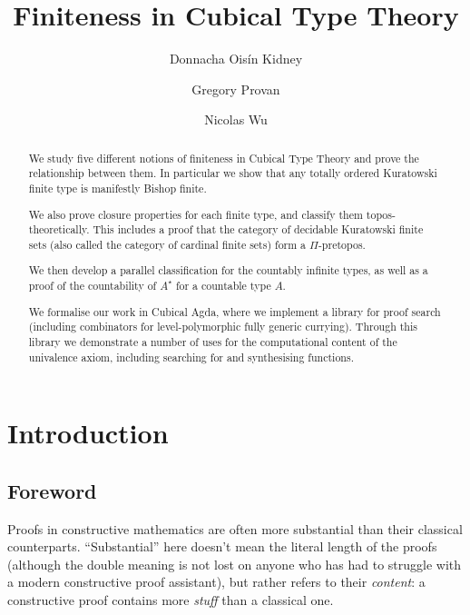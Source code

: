 

\author{
  Donnacha Oisín Kidney \and
  Gregory Provan \and
  Nicolas Wu
}

\title{Finiteness in Cubical Type Theory}





\maketitle
\begin{abstract}
  We study five different notions of finiteness in Cubical Type Theory and prove
  the relationship between them.
  In particular we show that any totally ordered Kuratowski finite type is
  manifestly Bishop finite.

  We also prove closure properties for each finite type, and classify them
  topos-theoretically.
  This includes a proof that the category of decidable Kuratowski finite sets
  (also called the category of cardinal finite sets) form a \(\Pi\)-pretopos.

  We then develop a parallel classification for the countably infinite types, as
  well as a proof of the countability of \(A^\star\) for a countable type \(A\).

  We formalise our work in Cubical Agda, where we implement a library for proof
  search (including combinators for level-polymorphic fully generic currying).
  Through this library we demonstrate a number of uses for the computational
  content of the univalence axiom, including searching for and synthesising
  functions.
\end{abstract}


\section{Introduction}
\subsection{Foreword}
Proofs in constructive mathematics are often more substantial than their
classical counterparts.
``Substantial'' here doesn't mean the literal length of the proofs (although the
double meaning is not lost on anyone who has had to struggle with a modern
constructive proof assistant), but rather refers to their \emph{content}: a
constructive proof contains more \emph{stuff} than a classical one.

